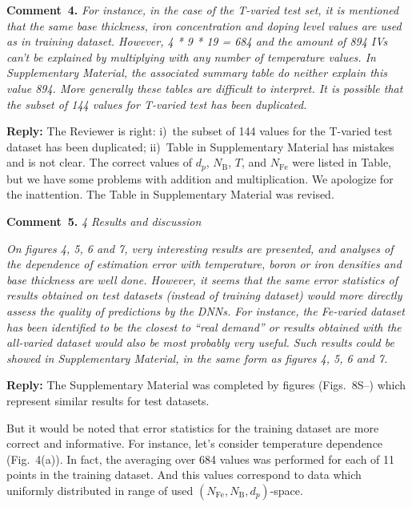 \documentclass[num-refs]{wiley-article} %
\begin{document}
\vspace{1cm}
\noindent
\textcolor[rgb]{0.00,0.50,1.00}{\textbf{Comment~4.}}
\emph{
For instance, in the case of the T-varied test set, it is mentioned that the same base thickness,
iron concentration and doping level values are used as in training dataset.
However, 4 * 9 * 19 = 684 and the amount of 894 IVs can’t be explained by multiplying with any number of temperature values.
In Supplementary Material, the associated summary table do neither explain this value 894. More generally these tables are difficult to interpret. It is possible that the subset of 144 values for T-varied test has been duplicated. }

\vspace{0.5cm}
\noindent
\textcolor[rgb]{0.51,0.00,0.00}{\textbf{Reply:}}
The Reviewer is  right:
i)~the subset of 144 values for the T-varied test dataset has been duplicated;
ii)~Table in Supplementary Material has mistakes and is not clear.
The correct values of $d_p$, $N_\mathrm{B}$, $T$, and $N_{\mathrm{Fe}}$ were listed in Table,
but we have some problems with addition and multiplication.
We apologize for the inattention.
The Table in Supplementary Material was revised.

\vspace{1cm}
\noindent
\textcolor[rgb]{0.00,0.50,1.00}{\textbf{Comment~5.}}
\emph{4 Results and discussion}

\emph{
On figures 4, 5, 6 and 7, very interesting results are presented,
and analyses of the dependence of estimation
error with temperature, boron or iron densities and base thickness are well done.
However, it seems that the same error statistics of results obtained on test datasets
(instead of training dataset) would more directly assess the quality of predictions by the DNNs.
For instance, the Fe-varied dataset has been identified to be
the closest to “real demand” or results obtained with the all-varied dataset
would also be most probably very useful.
Such results could be showed in Supplementary Material, in the same form as figures 4, 5, 6 and 7. }

\vspace{0.5cm}
\noindent
\textcolor[rgb]{0.51,0.00,0.00}{\textbf{Reply:}}
The Supplementary Material was completed by figures (Figs.~8S--)
which  represent similar results for test datasets.

But it would be noted that error statistics for the training dataset are more correct and informative.
For instance, let's consider temperature dependence (Fig.~4(a)).
In fact, the averaging over 684 values was performed for each of 11 points in the training dataset.
And this values correspond to data which uniformly distributed in range of used $(N_\mathrm{Fe},N_\mathrm{B},d_p)$-space.
\end{document}
